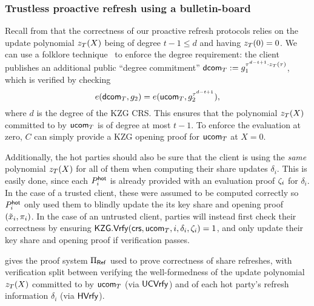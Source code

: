 \subsubsection{Trustless proactive refresh using a bulletin-board}\label{sec:fs_protocol}

Recall from  that the correctness of our proactive refresh protocols relies on the update polynomial $z_{T}(X)$ being of degree $t-1 \leq d$ and having $z_{T}(0)=0$. 
We can use a folklore technique~\cite[\S2.5]{EC:CHMMVW20} 
to enforce the degree requirement: the client publishes an additional public ``degree commitment'' $\mathsf{dcom}_{T} := g_1^{\tau^{d-t+1} \cdot z_{T}(\tau)}$, %
which is verified by checking
\[
    e(\dcom_\timeT, g_2) = e(\ucom_\timeT, g_2^{\tau^{d-t+1}}), %
\]
where $d$ is the degree of the KZG CRS. This ensures that the polynomial $z_{T}(X)$ committed to by $\mathsf{ucom}_{T}$ is of degree at most $t-1$. To enforce the evaluation at zero, $C$ can simply provide a KZG opening proof for $\mathsf{ucom}_{T}$ at $X=0$.

Additionally, the hot parties should also be sure that the client is using the \emph{same} polynomial $z_{T}(X)$ for all of them when computing their share updates $\delta_i$. This is easily done, since each $P_i^{\mathsf{hot}}$ is already provided with an evaluation proof $\zeta_i$ for $\delta_i$. In the case of a trusted client, these were assumed to be computed correctly so $P_i^{\mathsf{hot}}$ only used them to blindly update the its key share and opening proof $(\tilde{x}_i, \pi_i)$. In the case of an untrusted client, parties will instead first check their correctness by ensuring $\mathsf{KZG}.\mathsf{Vrfy}(\mathsf{crs}, \mathsf{ucom}_{T}, i, \delta_i, \zeta_i) = 1$, and only update their key share and opening proof if verification passes.


 gives the proof system $\Pi_{\sf Ref}$ used to prove correctness of share refreshes, with verification split between verifying the well-formedness of the update polynomial $z_{T}(X)$ committed to by ${\sf u}\mathsf{com}_{T}$ (via ${\sf UC}\mathsf{Vrfy}$) and of each hot party's refresh information $\delta_i$ (via ${\sf H}\mathsf{Vrfy}$).

